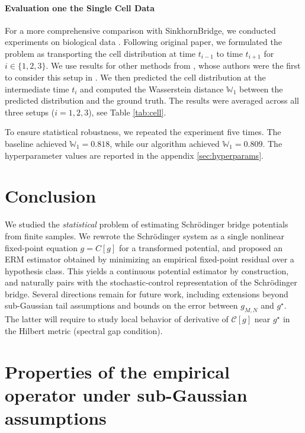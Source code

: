 \documentclass[11pt]{article}
\theoremstyle{remark}
\numberwithin{equation}{section}
\begin{document}
\paragraph{Evaluation one the Single Cell Data}

For a more comprehensive comparison with SinkhornBridge, we conducted experiments on biological data \citep{TongHuangWolfVanDijkKrishnaswamy2020}. Following original paper, we formulated the problem as transporting the cell distribution at time $t_{i-1}$ to time $t_{i+1}$ for $i \in \{1, 2, 3\}$. We use results for other methods from \citep{TongEtAl2023b}, whose authors were the first to consider this setup in \citep{TongHuangWolfVanDijkKrishnaswamy2020}. We then predicted the cell distribution at the intermediate time $t_i$ and computed the Wasserstein distance $\mathbb{W}_1$ between the predicted distribution and the ground truth. The results were averaged across all three setups ($i = 1, 2, 3$), see Table \ref{tab:cell}.

To ensure statistical robustness, we repeated the experiment five times. The baseline achieved $\mathbb{W}_1 = 0.818 $, while our algorithm achieved $\mathbb{W}_1 = 0.809 $. The hyperparameter values are reported in the appendix \ref{sec:hyperparams}.

\section{Conclusion}
We studied the \emph{statistical} problem of estimating Schr\"odinger bridge potentials from finite samples. We rewrote the Schr\"odinger system as a single nonlinear fixed-point equation
$g=C[g]$ for a transformed potential, and proposed an ERM estimator obtained by
minimizing an empirical fixed-point residual over a hypothesis class.
This yields a continuous potential estimator by construction, and naturally pairs with the stochastic-control
representation of the Schr\"odinger bridge. Several directions remain for future work, including extensions beyond sub-Gaussian tail
assumptions and bounds on the error between $g_{M,N}$ and $g^\star$. The latter will require to study local behavior of derivative of $\mathcal C[g]$ near $g^\star$ in the Hilbert metric (spectral gap condition).





\appendix

\section{Properties of the empirical operator under sub-Gaussian assumptions}
\end{document}
